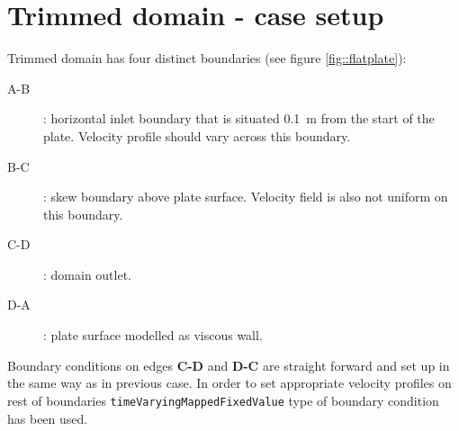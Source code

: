     \section{Trimmed domain - case setup}
        Trimmed domain has four distinct boundaries (see figure \ref{fig::flatplate}):
        \begin{description}
            \item[A-B]: horizontal inlet boundary that is situated \SI{0,1}{\metre} from the start of the plate.
                Velocity profile should vary across this boundary.
            \item[B-C]: skew boundary above plate surface. Velocity field is also not uniform on this boundary.
            \item[C-D]: domain outlet.
            \item[D-A]: plate surface modelled as viscous wall.   
        \end{description}
        
        Boundary conditions on edges \textbf{C-D} and \textbf{D-C} are straight forward and set up in the same way as in previous case. In order to set appropriate velocity profiles on rest of boundaries \texttt{timeVaryingMappedFixedValue} type of boundary condition has been used.
